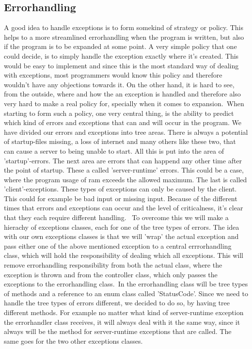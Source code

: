 \documentclass[a4paper,10pt,titlepage]{article}
\begin{document}
		\subsection{Errorhandling}
			A good idea to handle exceptions is to form somekind of strategy or policy. This helps to a more streamlined errorhandling
			when the program is written, but also if the program is to be expanded at some point. A very simple policy that one could decide, is to
			simply handle the exception exactly where it's created. This would be easy to implement and since this is the most standard way of dealing with
			exceptions, most programmers would know this policy and therefore wouldn't have any objections towards it. On the other hand, it is hard to see, from
			the outside, where and how the an exception is handled and therefore also very hard to make a real policy for, specially when it comes to expansion.\
			When starting to form such a policy, one very central thing, is the ability to predict which kind of errors and exceptions that can and will 
			occur in the program. We have divided our errors and exceptions into tree areas. There is always a potential of startup-files missing, a loss of internet and many others like these two, that can cause a server to being unable to start. All this is put into the area of 'startup'-errors. The next area are errors that can happend any other time after the point of startup. These a called 'server-runtime' errors. This could be a case, where the program usage of ram exceeds the allowed maximum. The last is called 'client'-exceptions. These types of exceptions can only be caused by the client. This could for example be bad input or missing input.  Because of the different times that errors and exceptions can occur and the level of criticalness, it's clear that they each require different handling. \
			To overcome this we will make a hierachy of exceptions classes, each for one of the tree types of errors. The idea with our own exceptions classes is that we will 'wrap' the actual exception and pass either one of the above mentioned exception to a central errrorhandling class, which will hold the responsibility of dealing which all exceptions. This will remove errorhandling responsibility from both the actual class, where the exception is thrown and from the controller class, which only passes the exceptions to the errorhandling class.\
			In the errorhandling class will be tree types of methods and a reference to an enum class called 'StatusCode'. Since we need to handle the tree types of errors different, we decided to do so, by having tree different methods. For example no matter what kind of server-runtime exception the errorhandler class receives, it will always deal with it the same way, since it always will be the method for server-runtime exceptions that are called. The same goes for the two other exceptions classes.\
\end{document}
